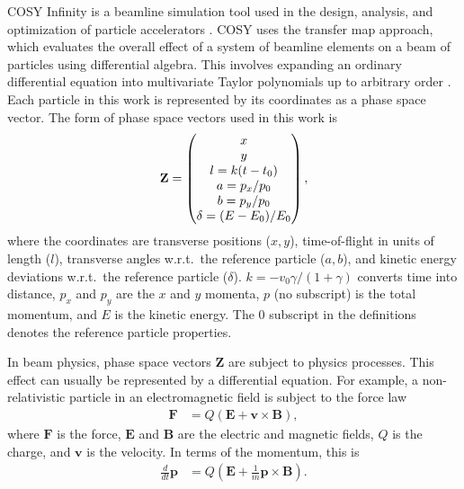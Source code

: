 \label{sec:cosy}\par
COSY Infinity is a beamline simulation tool used in the design, analysis, and optimization of particle accelerators \cite{cosy}. COSY uses the transfer map approach, which evaluates the overall effect of a system of beamline elements on a beam of particles using differential algebra. This involves expanding an ordinary differential equation into multivariate Taylor polynomials up to arbitrary order \cite{modernMapMethods}. Each particle in this work is represented by its coordinates as a phase space vector. The form of phase space vectors used in this work is
\begin{equation}
\centering
\mathbf{Z}=
\begin{pmatrix}
x\\ y\\ l=k(t-t_0)\\a=p_x/p_0\\b=p_y/p_0\\  \delta = (E-E_0)/E_0
\end{pmatrix},
\label{eqn:phaseSpaceVector}
\end{equation}
where the coordinates are transverse positions ($x, y$), time-of-flight in units of length ($l$), transverse angles w.r.t.\ the reference particle ($a, b$), and kinetic energy deviations w.r.t.\ the reference particle ($\delta$). $k=-v_0\gamma/(1+\gamma)$ converts time into distance, $p_x$ and $p_y$ are the $x$ and $y$ momenta, $p$ (no subscript) is the total momentum, and $E$ is the kinetic energy. The $0$ subscript in the definitions denotes the reference particle properties.

In beam physics, phase space vectors $\mathbf{Z}$ are subject to physics processes. This effect can usually be represented by a differential equation. For example, a non-relativistic particle in an electromagnetic field is subject to the force law \cite{griffithsem}
\begin{align}\nonumber
\mathbf{F}&=Q(\mathbf{E}+\mathbf{v}\times \mathbf{B}),
\end{align}
where $\mathbf{F}$ is the force, $\mathbf{E}$ and $\mathbf{B}$ are the electric and magnetic fields, $Q$ is the charge, and $\mathbf{v}$ is the velocity. In terms of the momentum, this is
\begin{align}\nonumber
\frac{d}{dt}\mathbf{p}&=Q(\mathbf{E}+\frac{1}{m}\mathbf{p}\times \mathbf{B}).
\end{align}

